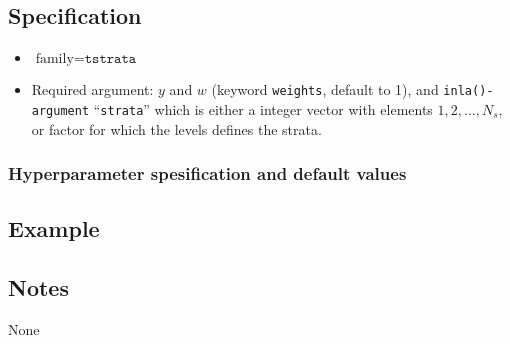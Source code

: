 \documentclass[a4paper,11pt]{article}
\begin{document}
\subsection*{Specification}

\begin{itemize}
\item $\text{family}=\texttt{tstrata}$
\item Required argument: $y$ and $w$ (keyword {\tt weights}, default
    to 1), and \texttt{inla()-argument} ``\texttt{strata}'' which is
    either a integer vector with elements $1, 2, \ldots, N_{s}$, or
    factor for which the levels defines the strata.
\end{itemize}

\subsubsection*{Hyperparameter spesification and default values}


\subsection*{Example}



\subsection*{Notes}
None
\end{document}
